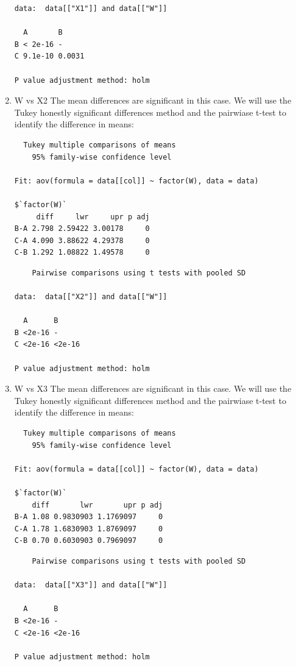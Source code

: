 \documentclass{article}
\begin{document}
\begin{enumerate}
\begin{lstlisting}
data:  data[["X1"]] and data[["W"]] 

  A       B     
B < 2e-16 -     
C 9.1e-10 0.0031

P value adjustment method: holm
  \end{lstlisting}
  
  \item W vs X2
  The mean differences are significant in this case. We will use the Tukey
  honestly significant differences method and the pairwiase t-test to identify
  the difference in means:
  \begin{lstlisting}
  Tukey multiple comparisons of means
    95% family-wise confidence level

Fit: aov(formula = data[[col]] ~ factor(W), data = data)

$`factor(W)`
     diff     lwr     upr p adj
B-A 2.798 2.59422 3.00178     0
C-A 4.090 3.88622 4.29378     0
C-B 1.292 1.08822 1.49578     0
  \end{lstlisting}
  
  \begin{lstlisting}
	Pairwise comparisons using t tests with pooled SD 

data:  data[["X2"]] and data[["W"]] 

  A      B     
B <2e-16 -     
C <2e-16 <2e-16

P value adjustment method: holm 
  \end{lstlisting}
  
  \item W vs X3
  The mean differences are significant in this case. We will use the Tukey
  honestly significant differences method and the pairwiase t-test to identify
  the difference in means:
  \begin{lstlisting}
  Tukey multiple comparisons of means
    95% family-wise confidence level

Fit: aov(formula = data[[col]] ~ factor(W), data = data)

$`factor(W)`
    diff       lwr       upr p adj
B-A 1.08 0.9830903 1.1769097     0
C-A 1.78 1.6830903 1.8769097     0
C-B 0.70 0.6030903 0.7969097     0
  \end{lstlisting}
  
  \begin{lstlisting}
	Pairwise comparisons using t tests with pooled SD 

data:  data[["X3"]] and data[["W"]] 

  A      B     
B <2e-16 -     
C <2e-16 <2e-16

P value adjustment method: holm
  \end{lstlisting}
\end{enumerate}
\end{document}

